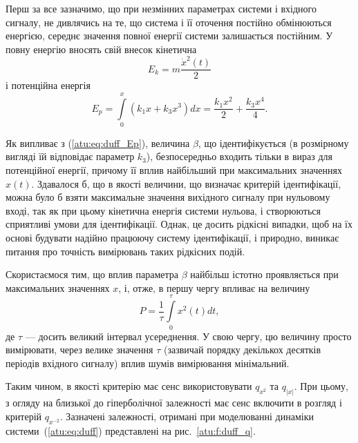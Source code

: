 Перш за все зазначимо, що при незмінних параметрах системи і
вхідного сигналу, не дивлячись на те, що система і її оточення
постійно обмінюються енергією, середнє значення повної енергії
системи залишається постійним. У повну енергію вносять свій
внесок кінетична
%
\begin{equation}
E_k = m \frac{\dot{x}^2(t)}{2}
\label{atu:eq:duff_Ek}
\end{equation}
%
і потенційна енергія
%
\begin{equation}
E_p = \int\limits_0^x ( k_1 x + k_3 x^3 ) dx =
\frac{k_1 x^2}{2} + \frac{k_3 x^4}{4}.
\label{atu:eq:duff_Ep}
\end{equation}

Як випливає з (\ref{atu:eq:duff_Ep}), величина $\beta$, що ідентифікується
(в розмірному вигляді їй відповідає параметр $k_3$), безпосередньо
входить тільки в вираз для потенційної енергії, причому її
вплив найбільший при максимальних значеннях $x(t)$.
Здавалося б, що в якості величини, що визначає критерій
ідентифікації, можна було б взяти максимальне значення
вихідного сигналу при нульовому вході, так як при цьому
кінетична енергія системи нульова, і створюються сприятливі
умови для ідентифікації. Однак, це досить рідкісні випадки, щоб
на їх основі будувати надійно працюючу систему ідентифікації,
і природно, виникає питання про точність вимірювань таких
рідкісних подій.

Скористаємося тим, що вплив параметра \(\beta \) найбільш істотно проявляється
при максимальних значеннях \(x \), і, отже, в першу чергу впливає
на величину
%
\begin{equation}
 P = \frac{1}{\tau}\int\limits_0^\tau x^2(t) dt ,
\label{atu:eq:duff_P}
\end{equation}
%
де \(\tau \) --- досить великий інтервал усереднення. У свою чергу,
цю величину просто вимірювати, через велике значення \(\tau \)
(зазвичай порядку декількох десятків періодів вхідного сигналу)
вплив шумів вимірювання мінімальний.

Таким чином, в якості критерію має сенс використовувати
$q_{x^2}$ та
$q_{|x|}$. При цьому, з огляду на близької до гіперболічної
залежності має сенс включити в розгляд і критерій
$q_{x^{-2}} $. Зазначені залежності, отримані при моделюванні
динаміки системи~(\ref{atu:eq:duff}) представлені на рис.~\ref{atu:f:duff_q}.

